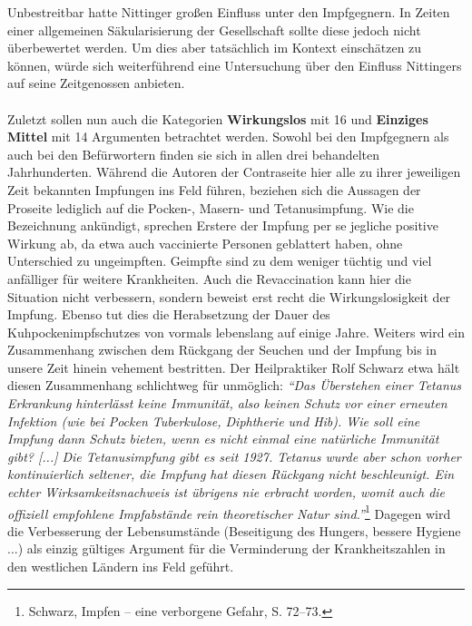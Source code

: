 \documentclass[
    a4paper,
    12pt,
    hyphens,
    chapterprefix=true,
    headheight=33pt,
    footheight=29pt,
    headings=optiontohead, %
]{scrartcl}
\begin{document}
{ Unbestreitbar hatte Nittinger großen Einfluss unter den Impfgegnern. In Zeiten einer allgemeinen Säkularisierung der Gesellschaft sollte diese jedoch nicht überbewertet werden. Um dies aber tatsächlich im Kontext einschätzen zu können, würde sich weiterführend eine Untersuchung über den Einfluss Nittingers auf seine Zeitgenossen anbieten.\\
\\
Zuletzt sollen nun auch die Kategorien \textbf{Wirkungslos} mit 16 und \textbf{Einziges Mittel} mit 14 Argumenten betrachtet werden. Sowohl bei den Impfgegnern als auch bei den Befürwortern finden sie sich in allen drei behandelten Jahrhunderten. Während die Autoren der Contraseite hier alle zu ihrer jeweiligen Zeit bekannten Impfungen ins Feld führen, beziehen sich die Aussagen der Proseite lediglich auf die Pocken-, Masern- und Tetanusimpfung. Wie die Bezeichnung ankündigt, sprechen Erstere der Impfung per se jegliche positive Wirkung ab, da etwa auch vaccinierte Personen geblattert haben, ohne Unterschied zu ungeimpften. Geimpfte sind zu dem weniger tüchtig und viel anfälliger für weitere Krankheiten. Auch die Revaccination kann hier die Situation nicht verbessern, sondern beweist erst recht die Wirkungslosigkeit der Impfung. Ebenso tut dies die Herabsetzung der Dauer des Kuhpockenimpfschutzes von vormals lebenslang auf einige Jahre. Weiters wird ein Zusammenhang zwischen dem Rückgang der Seuchen und der Impfung bis in unsere Zeit hinein vehement bestritten. Der Heilpraktiker Rolf Schwarz etwa hält diesen Zusammenhang schlichtweg für unmöglich: \textit{"`Das Überstehen einer Tetanus Erkrankung hinterlässt keine Immunität, also keinen Schutz vor einer erneuten Infektion (wie bei Pocken Tuberkulose, Diphtherie und Hib). Wie soll eine Impfung dann Schutz bieten, wenn es nicht einmal eine natürliche Immunität gibt? [...] Die Tetanusimpfung gibt es seit 1927. Tetanus wurde aber schon vorher kontinuierlich seltener, die Impfung hat diesen Rückgang nicht beschleunigt. Ein echter Wirksamkeitsnachweis ist übrigens nie erbracht worden, womit auch die offiziell empfohlene Impfabstände rein theoretischer Natur sind."'}\footnote{Schwarz, Impfen -- eine verborgene Gefahr, S. 72--73.} Dagegen wird die Verbesserung der Lebensumstände (Beseitigung des Hungers, bessere Hygiene ...) als einzig gültiges Argument für die Verminderung der Krankheitszahlen in den westlichen Ländern ins Feld geführt.\\
}
\end{document}
